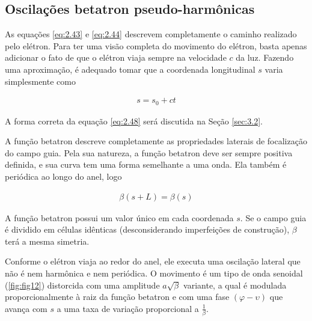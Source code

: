 \subsection{Oscilações betatron pseudo-harmônicas}
As equações \eqref{eq:2.43} e \eqref{eq:2.44} descrevem completamente o caminho realizado pelo elétron. Para ter uma visão completa do movimento do elétron, basta apenas adicionar o fato de que o elétron viaja sempre na velocidade $c$ da luz. Fazendo uma aproximação, é adequado tomar que a coordenada longitudinal $s$ varia simplesmente como
	
\begin{align}
	s = s_0 + ct\label{eq:2.48}
\end{align}
	
A forma correta da equação \eqref{eq:2.48} será discutida na Seção \ref{sec:3.2}.
	
A função betatron descreve completamente as propriedades laterais de focalização do campo guia. Pela sua natureza, a função betatron deve ser sempre positiva definida, e sua curva tem uma forma semelhante a uma onda. Ela também é periódica ao longo do anel, logo
	
\begin{align}
	\beta(s+L) = \beta(s)
\end{align}
	
A função betatron possui um valor único em cada coordenada $s$. Se o campo guia é dividido em células idênticas (desconsiderando imperfeições de construção), $\beta$ terá a mesma simetria.
	
Conforme o elétron viaja ao redor do anel, ele executa uma oscilação lateral que não é nem harmônica e nem periódica. O movimento é um tipo de onda senoidal (\ref{fig:fig12}) distorcida com uma amplitude $a\sqrt{\beta}$ variante, a qual é modulada proporcionalmente à raiz da função betatron e com uma fase $(\varphi-\upsilon)$ que avança com $s$ a uma taxa de variação proporcional a $\frac{1}{\beta}$.
	
